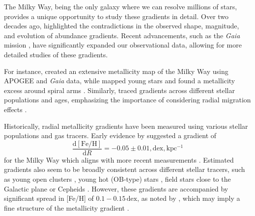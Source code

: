 \documentclass[fleqn,usenatbib]{mnras}
\begin{document}
The Milky Way, being the only galaxy where we can resolve millions of stars, provides a unique opportunity to study these gradients in detail. Over two decades ago, \citet{Chiappini2002} highlighted the contradictions in the observed shape, magnitude, and evolution of abundance gradients. Recent advancements, such as the \textit{Gaia} mission \citep{Gaia-Collaboration2016}, have significantly expanded our observational data, allowing for more detailed studies of these gradients.

For instance, \citet{Hogg2019} created an extensive metallicity map of the Milky Way using APOGEE and \textit{Gaia} data, while \citet{Poggio2022} mapped young stars and found a metallicity excess around spiral arms \citep[see also][]{Zari2018, Zari2021, Poggio2021, Hackshaw2024}. Similarly, \citet[][among others]{Imig2023} traced gradients across different stellar populations and ages, emphasizing the importance of considering radial migration effects \citep{Binney2008, Frankel2018, Frankel2020}.

Historically, radial metallicity gradients have been measured using various stellar populations and gas tracers. Early evidence by \citet{Janes1979} suggested a gradient of
\begin{equation}
\frac{\mathrm{d{[Fe/H]}}}{\mathrm{d}R} = -0.05 \pm 0.01,\mathrm{dex,kpc^{-1}}
\end{equation}
for the Milky Way which aligns with more recent measurements \citep{Anders2017, Hayden2015}. Estimated gradients also seem to be broadly consistent across different stellar tracers, such as young open clusters \citep[e.g.][]{Cunha2016, Magrini2017, Casamiquela2019, Donor2020, Spina2021,Myers2022}, young hot (OB-type) stars \citep{Zari2018, Zari2021, Poggio2021, Poggio2022}, field stars close to the Galactic plane \citep[e.g.][]{Bergemann2014} or Cepheids \citep{Andrievsky2002, Andrievsky2002b, Lemasle2007, Lemasle2013}. However, these gradients are accompanied by significant spread in [Fe/H] of $0.1-0.15\,\mathrm{dex}$, as noted by \citet{Twarog1980}, which may imply a fine structure of the metallicity gradient \citep[see][]{Genovali2014}.
\end{document}
